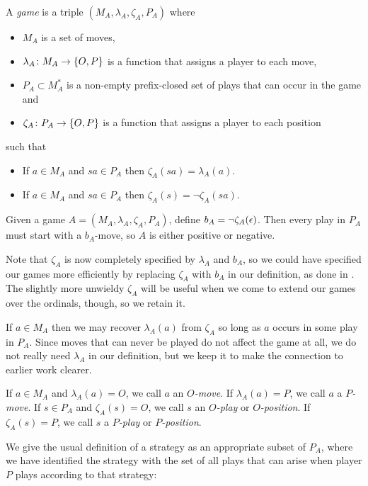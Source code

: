 \documentclass[11pt]{article} %
\begin{document}
\begin{definition}
  A \emph{game} is a triple $(M_A,\lambda_A,\zeta_A,P_A)$ where
  \begin{itemize}
    \item $M_A$ is a set of moves,
    \item $\lambda_A\colon{}M_A\to{}\{O,P\}$ is a function that assigns a player to each move,
    \item $P_A\subset M_A^*$ is a non-empty prefix-closed set of plays that can occur in the game and
    \item $\zeta_A\colon{}P_A\to{}\{O,P\}$ is a function that assigns a player to each position
  \end{itemize}
  such that
  \begin{itemize}
    \item If $a\in M_A$ and $sa\in P_A$ then $\zeta_A(sa)=\lambda_A(a)$.
    \item If $a\in M_A$ and $sa\in P_A$ then $\zeta_A(s)=\neg\zeta_A(sa)$.
  \end{itemize}
\end{definition}

\begin{remark}
  Given a game $A=(M_A,\lambda_A,\zeta_A,P_A)$, define $b_A=\neg\zeta_A(\epsilon)$.  Then every play in $P_A$ must start with a $b_A$-move, so $A$ is either positive or negative.

  Note that $\zeta_A$ is now completely specified by $\lambda_A$ and $b_A$, so we could have specified our games more efficiently by replacing $\zeta_A$ with $b_A$ in our definition, as done in \cite{martinsthesis}.  The slightly more unwieldy $\zeta_A$ will be useful when we come to extend our games over the ordinals, though, so we retain it.

  If $a\in M_A$ then we may recover $\lambda_A(a)$ from $\zeta_A$ so long as $a$ occurs in some play in $P_A$.  Since moves that can never be played do not affect the game at all, we do not really need $\lambda_A$ in our definition, but we keep it to make the connection to earlier work clearer.

  If $a\in M_A$ and $\lambda_A(a)=O$, we call $a$ an \emph{$O$-move}.  If $\lambda_A(a)=P$, we call $a$ a \emph{$P$-move}.  If $s\in P_A$ and $\zeta_A(s)=O$, we call $s$ an \emph{$O$-play} or \emph{$O$-position}.  If $\zeta_A(s)=P$, we call $s$ a \emph{$P$-play} or \emph{$P$-position}.
\end{remark}

We give the usual definition of a strategy as an appropriate subset of $P_A$, where we have identified the strategy with the set of all plays that can arise when player $P$ plays according to that strategy:
\end{document}
